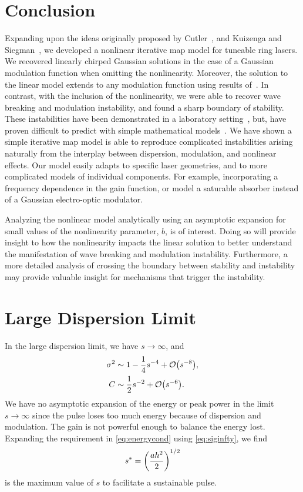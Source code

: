 \documentclass[9pt,twocolumn,twoside]{osajnl}
\let\originalleft\left
\let\originalright\right
\renewcommand{\left}{\mathopen{}\mathclose\bgroup\originalleft}
\renewcommand{\right}{\aftergroup\egroup\originalright}
\providecommand{\bigO}[1]{\ensuremath{\mathop{}\mathopen{}\mathcal{O}\mathopen{}\left(#1\right)}} %
\begin{document}
\section{Conclusion}
\label{sec:conclusion}
Expanding upon the ideas originally proposed by Cutler~\cite{cutler1955}, and Kuizenga and Siegman~\cite{kuizenga1970, kuizenga1970a, siegman1969}, we developed a nonlinear iterative map model for tuneable ring lasers. We recovered linearly chirped Gaussian solutions in the case of a Gaussian modulation function when omitting the nonlinearity. Moreover, the solution to the linear model extends to any modulation function using results of~\cite{calcaterra2008a}. In contrast, with the inclusion of the nonlinearity, we were able to recover wave breaking and modulation instability, and found a sharp boundary of stability. These instabilities have been demonstrated in a laboratory setting~\cite{agrawal2013, anderson1992, finot2008, rothenberg1989b, tomlinson1985}, but, have proven difficult to predict with simple mathematical models~\cite{meng2020}. We have shown a simple iterative map model is able to reproduce complicated instabilities arising naturally from the interplay between dispersion, modulation, and nonlinear effects. Our model easily adapts to specific laser geometries, and to more complicated models of individual components. For example, incorporating a frequency dependence in the gain function, or model a saturable absorber instead of a Gaussian electro-optic modulator.

Analyzing the nonlinear model analytically using an asymptotic expansion for small values of the nonlinearity parameter, $b$, is of interest. Doing so will provide insight to how the nonlinearity impacts the linear solution to better understand the manifestation of wave breaking and modulation instability. Furthermore, a more detailed analysis of crossing the boundary between stability and instability may provide valuable insight for mechanisms that trigger the instability.

\appendix
\section{Large Dispersion Limit}
\label{sec:largedisp}
In the large dispersion limit, we have $s \rightarrow \infty$, and
\begin{align}
	\sigma^2 &\sim 1 - \frac{1}{4}s^{-4} + \bigO{s^{-8}}, \label{eq:siginfty} \\
	C &\sim \frac{1}{2}s^{-2} + \bigO{s^{-6}}.
\end{align}
We have no asymptotic expansion of the energy or peak power in the limit $s \rightarrow \infty$ since the pulse loses too much energy because of dispersion and modulation. The gain is not powerful enough to balance the energy lost. Expanding the requirement in \eqref{eq:energycond} using \eqref{eq:siginfty}, we find 
\begin{align}
	s^* = \left( \frac{a h^2}{2} \right)^{1/2}
	\label{eq:maxs}
\end{align}
is the maximum value of $s$ to facilitate a sustainable pulse.
\end{document}
